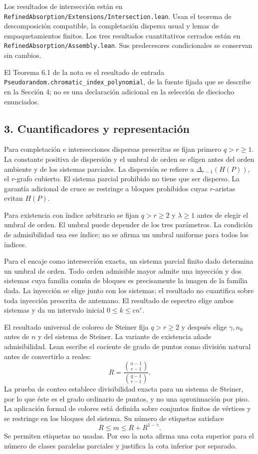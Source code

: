 \documentclass[spanish,11pt,a4paper]{article}
\begin{document}
Los resultados de intersección están en \texttt{Refined\allowbreak{}Absorption/\allowbreak{}Extensions/\allowbreak{}Intersection.\allowbreak{}lean}. Usan el teorema de descomposición compatible, la completación dispersa usual y lemas de empaquetamientos finitos. Los tres resultados cuantitativos cerrados están en \texttt{Refined\allowbreak{}Absorption/\allowbreak{}Assembly.\allowbreak{}lean}. Sus predecesores condicionales se conservan sin cambios.

El Teorema 6.1 de la nota es el resultado de entrada \texttt{Pseudorandom.\allowbreak{}chromatic\_\allowbreak{}index\_\allowbreak{}polynomial}, de la fuente fijada que se describe en la Sección 4; no es una declaración adicional en la selección de dieciocho enunciados.

\subsection{3. Cuantificadores y representación}\label{cuantificadores-y-representaciuxf3n}

Para completación e intersecciones dispersas prescritas se fijan primero \(q>r\ge1\). La constante positiva de dispersión y el umbral de orden se eligen antes del orden ambiente y de los sistemas parciales. La dispersión se refiere a \(\Delta_{r-1}(H(P))\), el \(r\)-grafo cubierto. El sistema parcial prohibido no tiene que ser disperso. La garantía adicional de cruce se restringe a bloques prohibidos cuyas \(r\)-aristas evitan \(H(P)\).

Para existencia con índice arbitrario se fijan \(q>r\ge2\) y \(\lambda\ge1\) antes de elegir el umbral de orden. El umbral puede depender de los tres parámetros. La condición de admisibilidad usa ese índice; no se afirma un umbral uniforme para todos los índices.

Para el encaje como intersección exacta, un sistema parcial finito dado determina un umbral de orden. Todo orden admisible mayor admite una inyección y dos sistemas cuya familia común de bloques es precisamente la imagen de la familia dada. La inyección se elige junto con los sistemas; el resultado no cuantifica sobre toda inyección prescrita de antemano. El resultado de espectro elige ambos sistemas y da un intervalo inicial \(0\le k\le c n^r\).

El resultado universal de coloreo de Steiner fija \(q>r\ge2\) y después elige \(\gamma,n_0\) antes de \(n\) y del sistema de Steiner. La variante de existencia añade admisibilidad. Lean escribe el cociente de grado de puntos como división natural antes de convertirlo a reales: \[R=\frac{\binom{n-1}{r-1}}{\binom{q-1}{r-1}}.\] La prueba de conteo establece divisibilidad exacta para un sistema de Steiner, por lo que éste es el grado ordinario de puntos, y no una aproximación por piso. La aplicación formal de colores está definida sobre conjuntos finitos de vértices y se restringe en los bloques del sistema. Su número de etiquetas satisface \[R\le m\le R+R^{1-\gamma}.\] Se permiten etiquetas no usadas. Por eso la nota afirma una cota superior para el número de clases paralelas parciales y justifica la cota inferior por separado.
\end{document}
